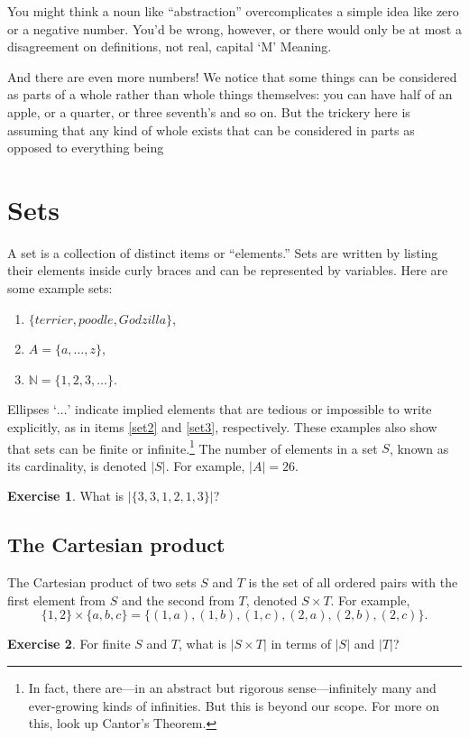 \documentclass{book}
\theoremstyle{definition}
\newtheorem{exercise}{Exercise}[chapter]
\theoremstyle{colonstylebf}
\newcommand{\set}[1]{\{#1\}}
\newcommand{\N}{\mathbb{N}}
\begin{document}
You might think a noun like ``abstraction'' overcomplicates a simple idea like zero or a negative number. You'd be wrong, however, or there would only be at most a disagreement on definitions, not real, capital `M' Meaning. 



And there are even more numbers! We notice that some things can be considered as parts of a whole rather than whole things themselves: you can have half of an apple, or a quarter, or three seventh's and so on. But the trickery here is assuming that any kind of whole exists that can be considered in parts as opposed to everything being 


\section{Sets}
A set is a collection of distinct items or ``elements.'' Sets are written by listing their elements inside curly braces and can be represented by variables. Here are some example sets:
\begin{enumerate}[label = (\arabic*)]
\item $\set{terrier, poodle, Godzilla}$,
\item\label{set2} $A = \set{a, \dots, z}$,
\item\label{set3} $\N = \set{1, 2, 3, \dots}$.
\end{enumerate}
Ellipses `{$\dots$}' indicate implied elements that are tedious or impossible to write explicitly, as in items \ref{set2} and \ref{set3}, respectively. These examples also show that sets can be finite or infinite.\footnote{In fact, there are---in an abstract but rigorous sense---infinitely many and ever-growing kinds of infinities. But this is beyond our scope. For more on this, look up Cantor's Theorem.} The number of elements in a set $S$, known as its cardinality, is denoted $|S|$. For example, $|A| = 26$.

\begin{exercise}\label{distinct}
What is $|\{3, 3, 1, 2, 1, 3\}|$?
\end{exercise}

\subsection{The Cartesian product}
The Cartesian product of two sets $S$ and $T$ is the set of all ordered pairs with the first element from $S$ and the second from $T$, denoted $S \times T$.
For example, \[\set{1, 2} \times \set{a, b, c} = \set{(1, a), (1, b), (1, c), (2, a), (2, b), (2, c)}.\]
\begin{exercise}\label{cartesianques}
For finite $S$ and $T$, what is $|S \times T|$ in terms of $|S|$ and $|T|$?
\end{exercise}
\end{document}
